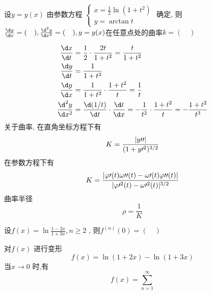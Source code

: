 \begin{question}
    设$ y = y(x) $ 由参数方程  $ 
    \begin{cases}
         x = \frac 1 2 \ln(1 + t^2)      \\
         y = \arctan t  
    \end{cases} $ 
    确定, 则$ \frac{\d y}{\d x} = (\quad) , \frac{\d^2 y}{\d x^2} = (\quad) , y = y(x) $在任意点处的曲率$ k = (\quad) $  
\end{question}

\begin{solution}
    \begin{align*}
        \frac{\d x}{\d t} &= \frac{1}{2} \cdot \frac{2t}{1 + t^2} = \frac{t}{1 + t^2}  \\  
        \frac{\d y}{\d t} &= \frac{1}{1 + t^2}  \\
        \frac{\d y}{\d x} &= \frac{1}{1 + t^2} \cdot \frac{1 + t^2}{t} = \frac{1}{t} \\
        \frac{\d^2 y}{\d x^2} &= \frac{\d (1 / t)}{\d t} \cdot \frac{\d t}{\d x} = -\frac{1}{t^2} \cdot \frac{1 + t^2}{t} = -\frac{1 + t^2}{t^3}
    \end{align*}
    关于曲率, 在直角坐标方程下有
    \begin{equation*}
        K = \frac{\lvert y\prime\prime\rvert}{(1 + y\prime^2)^{3 / 2}}
    \end{equation*}
    在参数方程下有
    \begin{equation*}
        K = \frac{\lvert \varphi\prime(t)\omega\prime\prime(t) - \omega\prime(t) \varphi\prime\prime(t)\rvert}{\lvert \varphi\prime^2(t) - \omega\prime^2(t) \rvert^{3/2}}
    \end{equation*}
    曲率半径
    \begin{equation*}
        \rho = \frac{1}{K}
    \end{equation*}
\end{solution}

\begin{question}
    设$ f(x) = \ln \frac{1 - 2x}{1 + 3x}, n \ge 2 $ , 则$ f^{(n)} (0) = (\quad) $ 
\end{question}

\begin{solution}
    对$ f(x) $ 进行变形
    \begin{equation*}
        f(x) = \ln (1 + 2x) - \ln (1 + 3x)
    \end{equation*}
    当$ x \to 0 $ 时,有
    \begin{equation*}
        f(x) = \sum_{n = 1}^{\infty}
    \end{equation*}
\end{solution}

